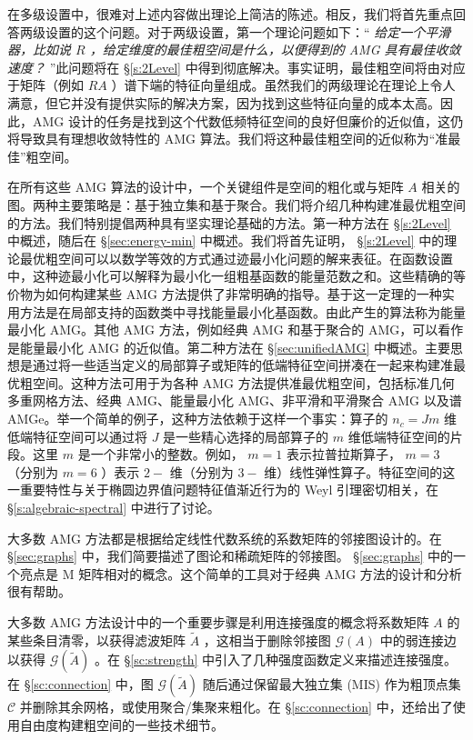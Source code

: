 \documentclass[12pt]{acta_2011xz}
\begin{document}
在多级设置中，很难对上述内容做出理论上简洁的陈述。相反，我们将首先重点回答两级设置的这个问题。对于两级设置，第一个理论问题如下：“ {    \it    给定一个平滑器，比如说    $R$    ，给定维度的最佳粗空间是什么，以便得到的 AMG 具有最佳收敛速度？   } ”此问题将在    \S       \ref{s:2Level}    中得到彻底解决。事实证明，最佳粗空间将由对应于矩阵（例如    $RA$   ）谱下端的特征向量组成。虽然我们的两级理论在理论上令人满意，但它并没有提供实际的解决方案，因为找到这些特征向量的成本太高。因此，AMG 设计的任务是找到这个代数低频特征空间的良好但廉价的近似值，这仍将导致具有理想收敛特性的 AMG 算法。我们将这种最佳粗空间的近似称为“准最佳”粗空间。  

在所有这些 AMG 算法的设计中，一个关键组件是空间的粗化或与矩阵    $A$    相关的图。两种主要策略是：基于独立集和基于聚合。我们将介绍几种构建准最优粗空间的方法。我们特别提倡两种具有坚实理论基础的方法。第一种方法在    \S       \ref{s:2Level}    中概述，随后在
   \S       \ref{sec:energy-min}    中概述。我们将首先证明，   \S       \ref{s:2Level}    中的理论最优粗空间可以以数学等效的方式通过迹最小化问题的解来表征。在函数设置中，这种迹最小化可以解释为最小化一组粗基函数的能量范数之和。这些精确的等价物为如何构建某些 AMG 方法提供了非常明确的指导。基于这一定理的一种实用方法是在局部支持的函数类中寻找能量最小化基函数。由此产生的算法称为能量最小化 AMG。其他 AMG 方法，例如经典 AMG 和基于聚合的 AMG，可以看作是能量最小化 AMG 的近似值。第二种方法在    \S       \ref{sec:unifiedAMG}    中概述。主要思想是通过将一些适当定义的局部算子或矩阵的低端特征空间拼凑在一起来构建准最优粗空间。这种方法可用于为各种 AMG 方法提供准最优粗空间，包括标准几何多重网格方法、经典 AMG、能量最小化 AMG、非平滑和平滑聚合 AMG 以及谱 AMGe。举一个简单的例子，这种方法依赖于这样一个事实：算子的    $n_c=Jm$    维低端特征空间可以通过将
   $J$    是一些精心选择的局部算子的    $m$    维低端特征空间的片段。这里    $m$    是一个非常小的整数。例如，   $m=1$    表示拉普拉斯算子，   $m=3$   （分别为    $m=6$   ）表示    $2-$    维（分别为    $3-$    维）线性弹性算子。特征空间的这一重要特性与关于椭圆边界值问题特征值渐近行为的 Weyl 引理密切相关，在    \S       \ref{s:algebraic-spectral}    中进行了讨论。  

大多数 AMG 方法都是根据给定线性代数系统的系数矩阵的邻接图设计的。在
   \S       \ref{sec:graphs}    中，我们简要描述了图论和稀疏矩阵的邻接图。
   \S       \ref{sec:graphs}    中的一个亮点是 M 矩阵相对的概念。这个简单的工具对于经典 AMG 方法的设计和分析很有帮助。  

大多数 AMG 方法设计中的一个重要步骤是利用连接强度的概念将系数矩阵    $A$    的某些条目清零，以获得滤波矩阵    $\tilde A$    ，这相当于删除邻接图    $\mathcal G(A)$    中的弱连接边以获得    $\mathcal G(\tilde A)$    。在
   \S       \ref{sc:strength}    中引入了几种强度函数定义来描述连接强度。在
   \S       \ref{sc:connection}    中，图    $\mathcal G(\tilde A)$    随后通过保留最大独立集 (MIS) 作为粗顶点集    $\mathcal C$    并删除其余网格，或使用聚合/集聚来粗化。在    \S       \ref{sc:connection}    中，还给出了使用自由度构建粗空间的一些技术细节。  
\end{document}
